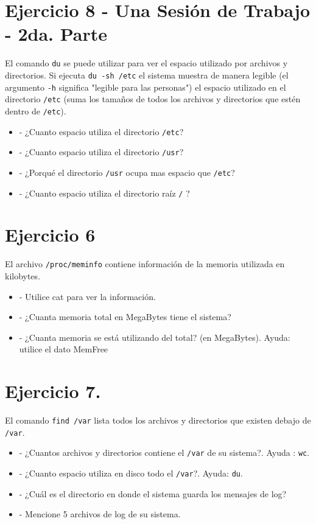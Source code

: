 \documentclass[12pt]{article}
\begin{document}
\section*{Ejercicio 8 - Una Sesión de Trabajo - 2da. Parte}
El comando \texttt{du} se puede utilizar para ver el espacio utilizado por archivos y directorios.
Si ejecuta \texttt{du -sh /etc} el sistema muestra de manera legible (el argumento \texttt{-h} significa "legible para las personas")
el espacio utilizado en el directorio \texttt{/etc} (suma los tamaños de todos los archivos y directorios que estén dentro de \texttt{/etc}).

\begin{itemize}
\item - ¿Cuanto espacio utiliza el directorio \texttt{/etc}?
\item - ¿Cuanto espacio utiliza el directorio \texttt{/usr}?
\item - ¿Porqué el directorio \texttt{/usr} ocupa mas espacio que \texttt{/etc}?
\item - ¿Cuanto espacio utiliza el directorio raíz \texttt{/} ?
\end{itemize}




\section*{Ejercicio 6}
El archivo \texttt{/proc/meminfo} contiene información de la memoria utilizada en kilobytes.

\begin{itemize}
\item - Utilice cat para ver la información.
\item - ¿Cuanta memoria total en MegaBytes tiene el sistema?
\item - ¿Cuanta memoria se está utilizando del total? (en MegaBytes). Ayuda: utilice el dato MemFree
\end{itemize}

\section*{Ejercicio 7.}
El comando \texttt{find /var} lista todos los archivos y directorios que existen debajo de \texttt{/var}.
\begin{itemize}
\item - ¿Cuantos archivos y directorios contiene el \texttt{/var} de su sistema?. Ayuda : \texttt{wc}.
\item - ¿Cuanto espacio utiliza en disco todo el \texttt{/var}?. Ayuda: \texttt{du}.
\item - ¿Cuál es el directorio en donde el sistema guarda los mensajes de log?
\item - Mencione 5 archivos de log de su sistema.
\end{itemize}
\end{document}
